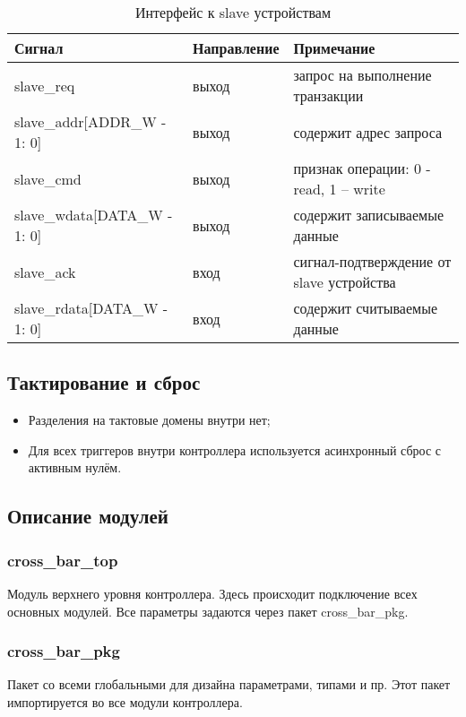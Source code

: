 \documentclass[a4paper, 10pt]{article}
\begin{document}
\begin{table}[h!]
 \caption{Интерфейс к slave устройствам}
 \centering
  \begin{tabular}{lll}
   \hline
   Сигнал & Направление & Примечание\\
   \hline 
   slave\_req                   & выход & запрос на выполнение транзакции\\
   slave\_addr[ADDR\_W - 1: 0]  & выход & содержит адрес запроса\\
   slave\_cmd                   & выход & признак операции: 0 - read, 1 – write\\
   slave\_wdata[DATA\_W - 1: 0] & выход & содержит записываемые данные\\
   slave\_ack                   & вход  & сигнал-подтверждение от slave устройства\\
   slave\_rdata[DATA\_W - 1: 0] & вход  & содержит считываемые данные\\
   \hline 
  \end{tabular}
\end{table}

\subsection{Тактирование и сброс}

\begin{itemize}
 \item Разделения на тактовые домены внутри нет; 
 \item Для всех триггеров внутри контроллера используется асинхронный сброс с активным нулём.
\end{itemize}

\subsection{Описание модулей}

\subsubsection{cross\_bar\_top}
Модуль верхнего уровня контроллера. Здесь происходит подключение всех основных модулей.
Все параметры задаются через пакет cross\_bar\_pkg.

\subsubsection{cross\_bar\_pkg}
Пакет со всеми глобальными для дизайна параметрами, типами и пр. Этот пакет импортируется во все модули контроллера.
\end{document}
